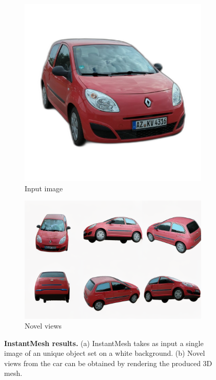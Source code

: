 \begin{figure}[htp!]
      \centering
      \begin{subfigure}{0.48\linewidth}
        \includegraphics[width=.7\linewidth]{images/introduction/input-instantmesh.png}
        \caption{Input image}
      \end{subfigure}
      \hfill
      \begin{subfigure}{0.48\linewidth}
        \includegraphics[width=\linewidth]{images/introduction/output-instantmesh.png}
        \caption{Novel views}
      \end{subfigure}
      \caption{\textbf{InstantMesh results.} (a) InstantMesh takes as input a single image of an unique object set on a white background. (b) Novel views from the car can be obtained by rendering the produced 3D mesh.}
    \label{fig:intro-instantmesh}
    \end{figure}




